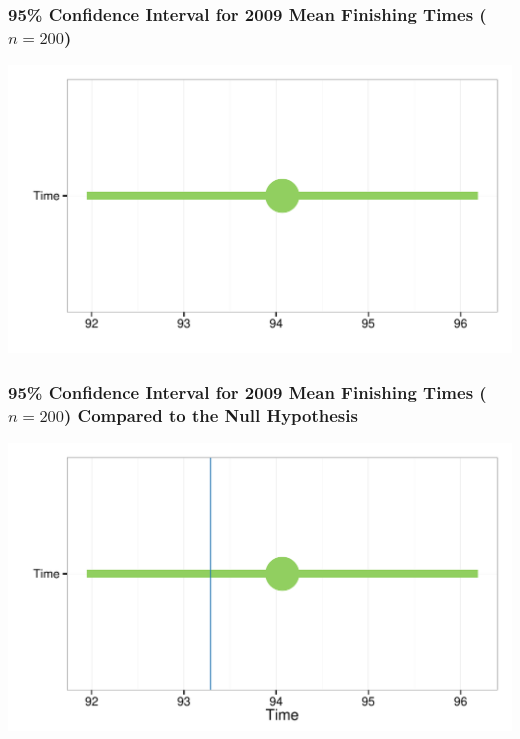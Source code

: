 \documentclass{beamer}\usepackage{graphicx, color}
\makeatletter
\def\maxwidth{ %
  \ifdim\Gin@nat@width>\linewidth
    \linewidth
  \else
    \Gin@nat@width
  \fi
}
\newenvironment{knitrout}{}{} %
\makeatother
\begin{document}
\begin{frame}[fragile]
  \frametitle{95\% Confidence Interval for 2009 Mean Finishing Times ($n = 200$)}
\begin{knitrout}
\color{fgcolor}

{\centering \includegraphics[width=\maxwidth]{figure/TimeCI} 

}


\end{knitrout}

\end{frame}

\begin{frame}[fragile]
  \frametitle{95\% Confidence Interval for 2009 Mean Finishing Times ($n = 200$) Compared to the Null Hypothesis}
\begin{knitrout}
\color{fgcolor}

{\centering \includegraphics[width=\maxwidth]{figure/TimeCINull} 

}


\end{knitrout}

\end{frame}
\end{document}
